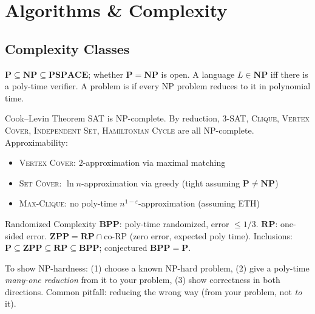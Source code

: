 \section{Algorithms \& Complexity}

\subsection{Complexity Classes}
$\mathbf{P}\subseteq\mathbf{NP}\subseteq\mathbf{PSPACE}$; whether $\mathbf{P}=\mathbf{NP}$
is open. A language $L\in\mathbf{NP}$ iff there is a poly-time verifier. A problem is
 if every NP problem reduces to it in polynomial time.

\begin{keyresult}{Cook–Levin Theorem}
\textsc{SAT} is NP-complete. By reduction, \textsc{3-SAT}, \textsc{Clique},
\textsc{Vertex Cover}, \textsc{Independent Set}, \textsc{Hamiltonian Cycle} are
all NP-complete. Approximability:
\begin{itemize}[topsep=1pt]
  \item \textsc{Vertex Cover}: $2$-approximation via maximal matching
  \item \textsc{Set Cover}: $\ln n$-approximation via greedy (tight assuming $\mathbf{P}\ne\mathbf{NP}$)
  \item \textsc{Max-Clique}: no poly-time $n^{1-\varepsilon}$-approximation (assuming ETH)
\end{itemize}
\end{keyresult}

\begin{defbox}{Randomized Complexity}
$\mathbf{BPP}$: poly-time randomized, error $\le 1/3$. $\mathbf{RP}$: one-sided error.
$\mathbf{ZPP} = \mathbf{RP}\cap\mathrm{co\text{-}RP}$ (zero error, expected poly time).
Inclusions: $\mathbf{P}\subseteq\mathbf{ZPP}\subseteq\mathbf{RP}\subseteq\mathbf{BPP}$;
conjectured $\mathbf{BPP}=\mathbf{P}$.
\end{defbox}

\begin{examtip}
To show NP-hardness: (1) choose a known NP-hard problem, (2) give a poly-time
\emph{many-one reduction} from it to your problem, (3) show correctness in both
directions. Common pitfall: reducing the wrong way (from your problem, not \emph{to} it).
\end{examtip}

